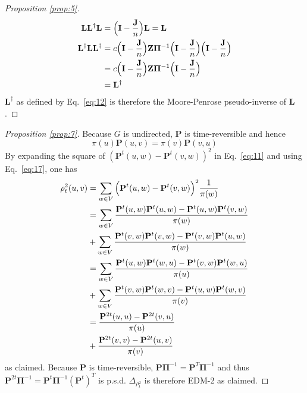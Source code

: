 \documentclass[10pt,twocolumn]{article}
\numberwithin{equation}{section}
\begin{document}
\begin{proof}[Proposition \ref{prop:5}]
\begin{align*}
    \mathbf{L}\mathbf{L}^{\dagger}\mathbf{L} & = \Bigl(\mathbf{I} -
    \frac{\mathbf{J}}{n}\Bigr) \mathbf{L} = \mathbf{L} \\
    \mathbf{L}^{\dagger}\mathbf{L}\mathbf{L}^{\dagger} &= c
    \Bigl(\mathbf{I} - \frac{\mathbf{J}}{n}\Bigr) \mathbf{Z}
    \bm{\Pi}^{-1} \Bigl(\mathbf{I} - \frac{\mathbf{J}}{n}\Bigr)
    \Bigl(\mathbf{I} - \frac{\mathbf{J}}{n}\Bigr) \\ &= c \Bigl(\mathbf{I}
    - \frac{\mathbf{J}}{n}\Bigr) \mathbf{Z} \bm{\Pi}^{-1}
    \Bigl(\mathbf{I} - \frac{\mathbf{J}}{n}\Bigr) \\ &=
    \mathbf{L}^{\dagger}
  \end{align*}
  $\mathbf{L}^{\dagger}$ as defined by Eq.~\eqref{eq:12} is therefore the
  Moore-Penrose pseudo-inverse of $\mathbf{L}$. 
\end{proof}
\begin{proof}[Proposition \ref{prop:7}]
  Because $G$ is undirected, $\mathbf{P}$ is time-reversible and hence
  \begin{equation}
    \label{eq:17}
    \pi(u) \mathbf{P}(u,v) = \pi(v) \mathbf{P}(v,u) 
  \end{equation}
  By expanding the square of $(\mathbf{P}^{t}(u,w) -
  \mathbf{P}^{t}(v,w))^{2}$ in Eq.~\eqref{eq:11} and using
  Eq.~\eqref{eq:17}, one has
  \begin{equation*}
    \begin{split}
      \rho_{t}^{2}(u,v) &= \sum_{w \in V}{\Bigl(\mathbf{P}^{t}(u,w) -
        \mathbf{P}^{t}(v,w)\Bigr)^2 \frac{1}{\pi(w)}} \\
      &= \sum_{w \in V}{\frac{\mathbf{P}^{t}(u,w)\mathbf{P}^{t}(u,w) -
          \mathbf{P}^{t}(u,w)\mathbf{P}^{t}(v,w)}{\pi(w)}} \\
      &+\sum_{w \in V}{\frac{\mathbf{P}^{t}(v,w)\mathbf{P}^{t}(v,w) -
          \mathbf{P}^{t}(v,w)\mathbf{P}^{t}(u,w)}{\pi(w)}} \\
      &= \sum_{w \in
        V}{\frac{\mathbf{P}^{t}(u,w)\mathbf{P}^{t}(w,u) -
          \mathbf{P}^{t}(v,w)\mathbf{P}^{t}(w,u)}{\pi(u)}} \\ &+
      \sum_{w \in V}{\frac{\mathbf{P}^{t}(v,w)\mathbf{P}^{t}(w,v)
          -
          \mathbf{P}^{t}(u,w)\mathbf{P}^{t}(w,v)}{\pi(v)}} \\
      &= \frac{\mathbf{P}^{2t}(u,u) -
        \mathbf{P}^{2t}(v,u)}{\pi(u)} \\ &+
      \frac{\mathbf{P}^{2t}(v,v) -
        \mathbf{P}^{2t}(u,v)}{\pi(v)} 
    \end{split} 
  \end{equation*}
  as claimed. Because $\mathbf{P}$ is time-reversible,
  $\mathbf{P}\bm{\Pi}^{-1} = \mathbf{P}^{T}\bm{\Pi}^{-1}$ and thus
  $\mathbf{P}^{2t}\bm{\Pi}^{-1} =
  \mathbf{P}^{t}\bm{\Pi}^{-1}(\mathbf{P}^{t})^{T}$ is
  p.s.d. $\Delta_{\rho_{t}^{2}}$ is therefore EDM-2 as claimed.
\end{proof} 
\end{document}
